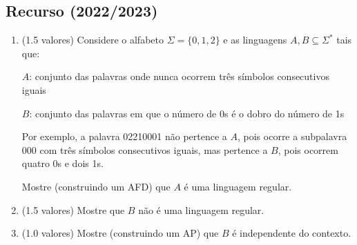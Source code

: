 \documentclass[a4paper,12pt]{article}
\begin{document}
\vspace{1.0cm}
\subsection*{Recurso (2022/2023)}
\begin{enumerate}[label=\alph*)]
  \item (1.5 valores) Considere o alfabeto \(\Sigma = \{0, 1, 2\}\) e as linguagens \(A, B \subseteq \Sigma^*\) tais que:

  \(A\): conjunto das palavras onde nunca ocorrem três símbolos consecutivos iguais

  \(B\): conjunto das palavras em que o número de 0s é o dobro do número de 1s

  Por exemplo, a palavra 02210001 não pertence a \(A\), pois ocorre a subpalavra 000 com três símbolos consecutivos iguais, mas pertence a \(B\), pois ocorrem quatro 0s e dois 1s.

  Mostre (construindo um AFD) que \(A\) é uma linguagem regular.

  \item (1.5 valores) Mostre que \(B\) não é uma linguagem regular.

  \item (1.0 valores) Mostre (construindo um AP) que \(B\) é independente do contexto.
\end{enumerate}
\end{document}
